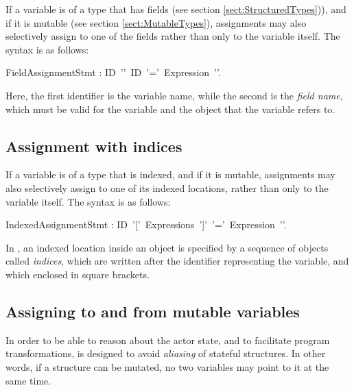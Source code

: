 
If a variable is of a type that
has fields (see section \ref{sect:StructuredTypes})), and if it is
mutable (see section \ref{sect:MutableTypes}), assignments may also
selectively assign to one of the fields rather than only to the
variable itself. The syntax is as follows:

\bgr 
   FieldAssignmentStmt : ID~'\charDot'~ID~'\charColon='~Expression~'\charSemi'.  
\egr

Here, the first identifier is the variable name, while the second is
the {\em field name}, which must be valid for the variable and the
object that the variable refers to.



\subsection{Assignment with indices}\label{sect:IndexedAssignment}


If a variable is of a type
that is indexed, and if it is mutable, assignments may also
selectively assign to one of its indexed locations, rather than only
to the variable itself. The syntax is as follows:

\bgr 
   IndexedAssignmentStmt : ID~'['~Expressions~']'~'\charColon='~Expression~'\charSemi'.  
\egr

In \Cal, an indexed location inside an object is specified by
a sequence of objects called {\em indices}, which are written after
the identifier representing the variable, and which enclosed in square
brackets.


\subsection{Assigning to and from mutable variables}\label{sect:MutableVarAssignments}

In order to be able to reason about the actor state,
and to facilitate program transformations, \Cal
is designed to avoid {\em aliasing} of stateful structures.  In other
words, if a structure can be mutated, no two variables may point to it
at the same time.


